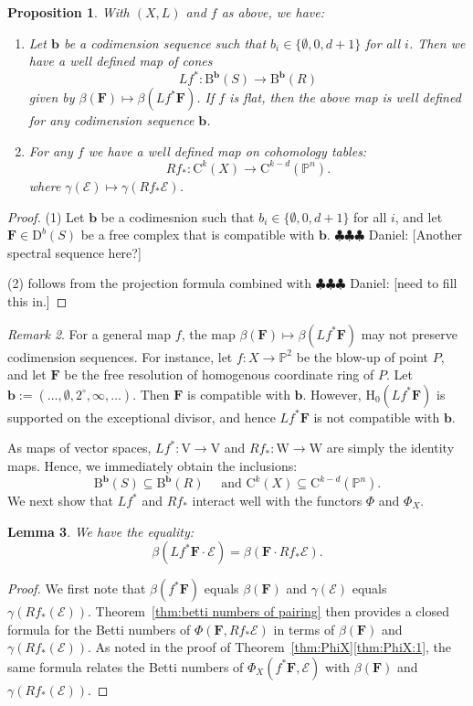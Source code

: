 \documentclass[12pt]{amsart}
\newtheorem{lemma}{Lemma}[section]
\newtheorem{prop}[lemma]{Proposition}
\theoremstyle{definition}
\theoremstyle{remark}
\newtheorem{remark}[lemma]{Remark}
\newcommand{\PP}{\mathbb{P}}
\newcommand{\HH}{\mathrm{H}}
\newcommand{\VV}{\mathrm{V}}
\newcommand{\WW}{\mathrm{W}}
\newcommand{\bb}{\mathbf{b}}
\newcommand{\cE}{\mathcal{E}}
\newcommand{\FF}{\mathbf{F}}
\newcommand{\zp}{\circ}
\newcommand{\DD}{\mathrm{D}}
\newcommand{\CQ}{\mathrm{C}}
\newcommand{\BBQ}{\mathrm{B}}
\newcommand{\daniel}[1]{{\color{green} \sf $\clubsuit\clubsuit\clubsuit$ Daniel: [#1]}}
\begin{document}
\begin{prop}\label{prop:pushpull}
With $(X,L)$ and $f$ as above, we have:
\begin{enumerate}
	\item Let $\bb$ be a codimension sequence such that $b_i\in \{\emptyset, 0,d+1\}$ for all $i$.   Then we have a well defined map of cones
	\[
Lf^*\colon \BBQ^{\bb}(S)\to \BBQ^{\bb}(R)
\]
given by $\beta(\FF)\mapsto \beta(Lf^*\FF)$.  If $f$ is flat, then the above map is well defined for any codimension sequence $\bb$.
	\item	For any $f$ we have a well defined map on cohomology tables:
\[
Rf_*\colon \CQ^k(X)\to \CQ^{k-d}(\PP^n).
\]
where $\gamma(\cE)\mapsto \gamma(Rf_* \cE)$.  
\end{enumerate}
\end{prop}
\begin{proof}
(1)  Let $\bb$ be a codimesnion such that $b_i\in \{\emptyset, 0, d+1\}$ for all $i$, and let $\FF\in \DD^b(S)$ be a free complex that is compatible with $\bb$.  \daniel{Another spectral sequence here?}

(2) follows from the projection formula combined with\daniel{need to fill this in.}
\end{proof}

\begin{remark}
For a general map $f$, the map $\beta(\FF)\mapsto \beta(Lf^*\FF)$ may not preserve codimension sequences.  For instance, let $f: X\to \PP^2$ be the blow-up of point $P$, and let $\FF$ be the free resolution of homogenous coordinate ring of $P$.  Let $\bb:=(\dots,\emptyset, 2^\zp,\infty,\dots)$.  Then $\FF$ is compatible with $\bb$.  However, $\HH_0(Lf^*\FF)$ is supported on the exceptional divisor, and hence $Lf^*\FF$ is not compatible with $\bb$.
\end{remark}

As maps of vector spaces, $Lf^*\colon \VV\to \VV$ and $Rf_*\colon \WW\to \WW$ are simply the identity maps.  Hence, we immediately obtain the inclusions:
\[
\BBQ^{\bb}(S)\subseteq \BBQ^{\bb}(R) \quad \text{ and } \CQ^k(X)\subseteq \CQ^{k-d}(\PP^n).
\]
We next show that $Lf^*$ and $Rf_*$ interact well with the functors $\Phi$ and $\Phi_X$.

\begin{lemma}\label{lem:general pairing}
We have the equality:
\[
\beta(Lf^*\FF\cdot \cE)=\beta(\FF\cdot Rf_*\cE).
\]
\end{lemma}
\begin{proof}
We first note that $\beta(f^*\FF)$ equals $\beta(\FF)$ and $\gamma(\cE)$ equals $\gamma(Rf_*(\cE))$.  Theorem~\ref{thm:betti numbers of pairing} then provides a closed formula for the Betti numbers of $\Phi(\FF,Rf_*\cE)$ in terms of $\beta(\FF)$ and $\gamma(Rf_*(\cE))$.  As noted in the proof of Theorem~\ref{thm:PhiX}\eqref{thm:PhiX:1}, the same formula relates the Betti numbers of $\Phi_X(f^*\FF,\cE)$ with  $\beta(\FF)$ and $\gamma(Rf_*(\cE))$.
\end{proof}
\end{document}
